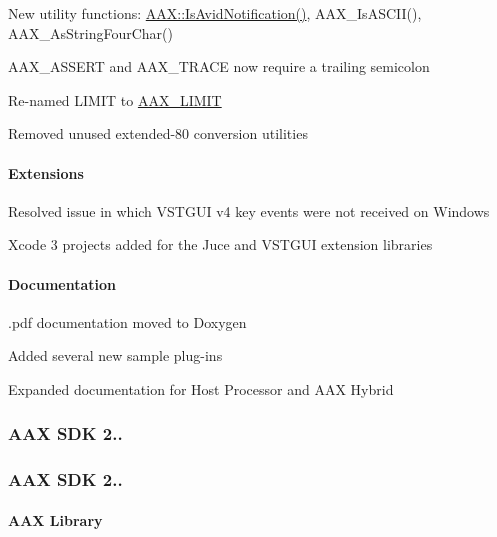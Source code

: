 \begin{DoxyItemize}
\item New utility functions\+: {\ttfamily \hyperlink{a00288_ab63efd791ab1cbbcdb004302b106c45c}{A\+A\+X\+::\+Is\+Avid\+Notification()}}, {\ttfamily A\+A\+X\+\_\+\+Is\+A\+S\+C\+I\+I()}, {\ttfamily A\+A\+X\+\_\+\+As\+String\+Four\+Char()}  
\item A\+A\+X\+\_\+\+A\+S\+S\+E\+R\+T and A\+A\+X\+\_\+\+T\+R\+A\+C\+E now require a trailing semicolon  
\item Re-\/named {\ttfamily L\+I\+M\+I\+T} to \hyperlink{a00295_af5bd671969b131ba73e1651befa4f51f}{A\+A\+X\+\_\+\+L\+I\+M\+I\+T}  
\item Removed unused extended-\/80 conversion utilities  
\end{DoxyItemize}\hypertarget{a00375_aax_sdk_2p1p0_Extensions}{}\paragraph{Extensions}\label{a00375_aax_sdk_2p1p0_Extensions}

\begin{DoxyItemize}
\item Resolved issue in which V\+S\+T\+G\+U\+I v4 key events were not received on Windows  
\item Xcode 3 projects added for the Juce and V\+S\+T\+G\+U\+I extension libraries  
\end{DoxyItemize}\hypertarget{a00375_aax_sdk_2p1p0_Documentation}{}\paragraph{Documentation}\label{a00375_aax_sdk_2p1p0_Documentation}

\begin{DoxyItemize}
\item .pdf documentation moved to Doxygen  
\item Added several new sample plug-\/ins  
\item Expanded documentation for Host Processor and A\+A\+X Hybrid  
\end{DoxyItemize}\hypertarget{a00375_aax_sdk_2p0p1}{}\subsubsection{A\+A\+X S\+D\+K 2..}\label{a00375_aax_sdk_2p0p1}
\hypertarget{a00375_aax_sdk_2p0p0}{}\subsubsection{A\+A\+X S\+D\+K 2..}\label{a00375_aax_sdk_2p0p0}
\hypertarget{a00375_aax_sdk_2p0p0_aax}{}\paragraph{A\+A\+X Library}\label{a00375_aax_sdk_2p0p0_aax}

